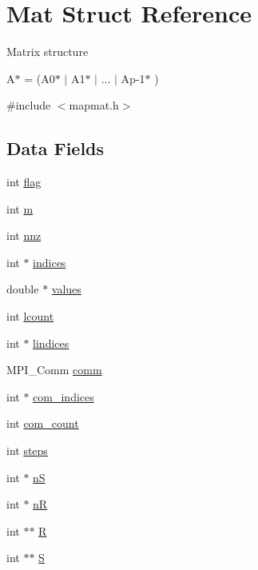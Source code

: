 \hypertarget{structMat}{\section{Mat Struct Reference}
\label{structMat}
}


Matrix structure \par
 A$\ast$ = (A0$\ast$ $|$ A1$\ast$ $|$ ... $|$ Ap-\/1$\ast$ )  




{\ttfamily \#include $<$mapmat.\-h$>$}

\subsection*{Data Fields}
\begin{DoxyCompactItemize}
\item 
int \hyperlink{structMat_a0ab8c39abb15ab5d8d0d990a37dadcc2}{flag}
\item 
int \hyperlink{structMat_a1656ea8b949ef48d4f0939f675a6d075}{m}
\item 
int \hyperlink{structMat_acd6e2a54ef05701b15d794040a3816a6}{nnz}
\item 
int $\ast$ \hyperlink{structMat_a47d869e53879ad1d2b0aed8f6f1f648a}{indices}
\item 
double $\ast$ \hyperlink{structMat_a6239320537db64ae9c1432f31f51e04b}{values}
\item 
int \hyperlink{structMat_a983857e6f4ddb2c19a5119bcf1b6af63}{lcount}
\item 
int $\ast$ \hyperlink{structMat_a26f484e28815cb59e3cd5600f8832de4}{lindices}
\item 
M\-P\-I\-\_\-\-Comm \hyperlink{structMat_a9a3894b7f67951ccae6fa1446fd00200}{comm}
\item 
int $\ast$ \hyperlink{structMat_acd1137be3acc4749cd1226022b9bbe67}{com\-\_\-indices}
\item 
int \hyperlink{structMat_ada2d04e4ec38ac2ce21099145b3b5e11}{com\-\_\-count}
\item 
int \hyperlink{structMat_a1f42610fea23791bc58f95d445a63838}{steps}
\item 
int $\ast$ \hyperlink{structMat_a17303d0444340f5349c9d23628a15914}{n\-S}
\item 
int $\ast$ \hyperlink{structMat_ab82b7beab655b5c6d0739a345d0566ed}{n\-R}
\item 
int $\ast$$\ast$ \hyperlink{structMat_a162f62ae4515e7d13f7de19c3bdb5583}{R}
\item 
int $\ast$$\ast$ \hyperlink{structMat_a1a774da8e5eb2c07a70491f3b14b96c7}{S}
\end{DoxyCompactItemize}


